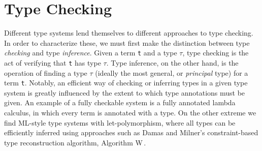 \section{Type Checking}
\label{sec:type-checking}





Different type systems lend themselves to different approaches to type checking. In order to characterize these, we must first make the distinction between type \emph{checking} and type \emph{inference}. Given a term \texttt{t} and a type $\tau$, type checking is the act of verifying that \texttt{t} has type $\tau$. Type inference, on the other hand, is the operation of finding a type $\tau$ (ideally the most general, or \emph{principal} type) for a term \texttt{t}. Notably, an efficient way of checking or inferring types in a given type system is greatly influenced by the extent to which type annotations must be given. An example of a fully checkable system is a fully annotated lambda calculus, in which every term is annotated with a type. On the other extreme we find ML-style type systems with let-polymorphism, where all types can be efficiently inferred using approaches such as Damas and Milner's constraint-based type reconstruction algorithm, Algorithm W\,\cite{Damas:1982}. 

